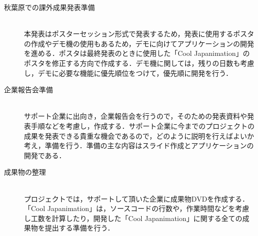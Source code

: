 \begin{description}
\item[秋葉原での課外成果発表準備]\mbox{}\\
本発表はポスターセッション形式で発表するため，発表に使用するポスタの作成やデモ機の使用もあるため，デモに向けてアプリケーションの開発を進める．ポスタは最終発表のときに使用した「Cool Japanimation」のポスタを修正する方向で作成する．デモ機に関しては，残りの日数も考慮し，デモに必要な機能に優先順位をつけて，優先順に開発を行う．
\item[企業報告会準備]\mbox{}\\
サポート企業に出向き，企業報告会を行うので，そのための発表資料や発表手順などを考慮し，作成する．サポート企業に今までのプロジェクトの成果を発表できる貴重な機会であるので，どのように説明を行えばよいか考え，準備を行う．準備の主な内容はスライド作成とアプリケーションの開発である．
\item[成果物の整理]\mbox{}\\
プロジェクトでは，サポートして頂いた企業に成果物DVDを作成する．「Cool Japanimation」は，ソースコードの行数や，作業時間などを考慮し工数を計算したり，開発した「Cool Japanimation」に関する全ての成果物を提出する準備を行う．
\end{description}
